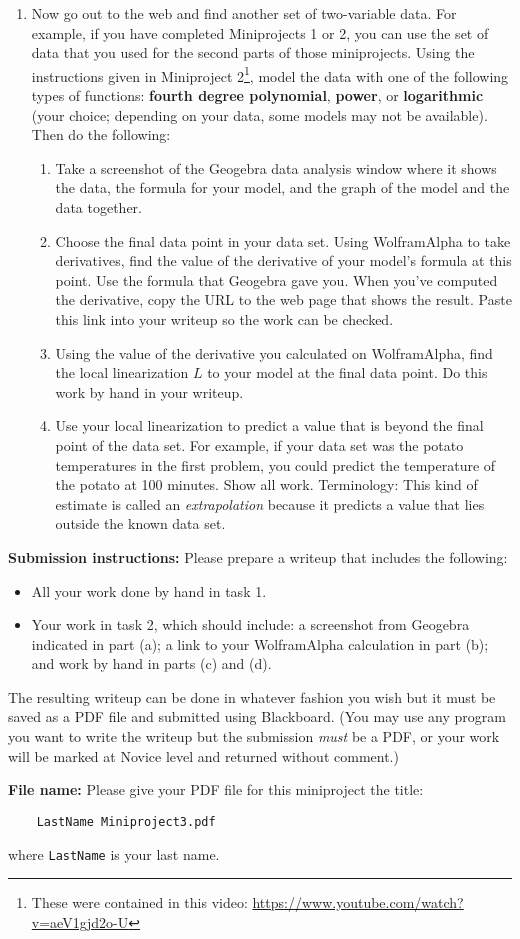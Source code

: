 \documentclass[11pt,letterpaper]{article}
\begin{document}
\begin{enumerate}
	\item Now go out to the web and find another set of two-variable data. For example, if you have completed Miniprojects 1 or 2, you can use the set of data that you used for the second parts of those miniprojects. Using the instructions given in Miniproject 2\footnote{These were contained in this video: \url{https://www.youtube.com/watch?v=aeV1gjd2o-U}}, model the data with one of the following types of functions: \textbf{fourth degree polynomial}, \textbf{power}, or \textbf{logarithmic} (your choice; depending on your data, some models may not be available). Then do the following: 
	\begin{enumerate}
		\item Take a screenshot of the Geogebra data analysis window where it shows the data, the formula for your model, and the graph of the model and the data together. 
		\item Choose the final data point in your data set. Using Wolfram\textbar Alpha to take derivatives, find the value of the derivative of your model's formula at this point. Use the formula that Geogebra gave you. When you've computed the derivative, copy the URL to the web page that shows the result. Paste this link into your writeup so the work can be checked. 
		\item Using the value of the derivative you calculated on Wolfram\textbar Alpha, find the local linearization $L$ to your model at the final data point. Do this work by hand in your writeup. 
		\item Use your local linearization to predict a value that is beyond the final point of the data set. For example, if your data set was the potato temperatures in the first problem, you could predict the temperature of the potato at 100 minutes. Show all work. Terminology: This kind of estimate is called an \emph{extrapolation} because it predicts a value that lies outside the known data set. 
	\end{enumerate}

\end{enumerate}


\hrulefill

\noindent
\textbf{Submission instructions:} Please prepare a writeup that includes the following: 
	\begin{itemize}
		\item All your work done by hand in task 1.  
		\item Your work in task 2, which should include: a screenshot from Geogebra indicated in part (a); a link to your Wolfram\textbar Alpha calculation in part (b); and work by hand in parts (c) and (d). 
	\end{itemize}
The resulting writeup can be done in whatever fashion you wish but it must be saved as a PDF file and submitted using Blackboard. (You may use any program you want to write the writeup but the submission \emph{must} be a PDF, or your work will be marked at Novice level and returned without comment.) 

\noindent
\textbf{File name:} Please give your PDF file for this miniproject the title: 
\begin{verbatim}
	LastName Miniproject3.pdf
\end{verbatim}
where \texttt{LastName} is your last name. 
\end{document}
